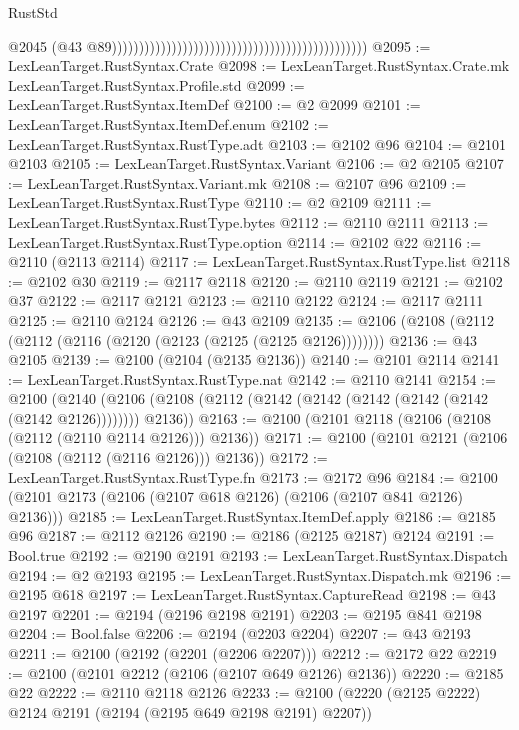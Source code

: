 \begin{lexlean}{RustStd}
\begin{coremodule}
{\begin{coremodule}
{{{{{{{{{{{{{{{{{{{{{{{{{{{{{{{{{{{{{{{{{{{{{{{{{{                                                                                                @2045
                                                                                                (@43
                                                                                                  @89)))))))))))))))))))))))))))))))))))))))))))))))
@2095 := LexLeanTarget.RustSyntax.Crate
@2098 := LexLeanTarget.RustSyntax.Crate.mk LexLeanTarget.RustSyntax.Profile.std
@2099 := LexLeanTarget.RustSyntax.ItemDef
@2100 := @2 @2099
@2101 := LexLeanTarget.RustSyntax.ItemDef.enum
@2102 := LexLeanTarget.RustSyntax.RustType.adt
@2103 := @2102 @96
@2104 := @2101 @2103
@2105 := LexLeanTarget.RustSyntax.Variant
@2106 := @2 @2105
@2107 := LexLeanTarget.RustSyntax.Variant.mk
@2108 := @2107 @96
@2109 := LexLeanTarget.RustSyntax.RustType
@2110 := @2 @2109
@2111 := LexLeanTarget.RustSyntax.RustType.bytes
@2112 := @2110 @2111
@2113 := LexLeanTarget.RustSyntax.RustType.option
@2114 := @2102 @22
@2116 := @2110 (@2113 @2114)
@2117 := LexLeanTarget.RustSyntax.RustType.list
@2118 := @2102 @30
@2119 := @2117 @2118
@2120 := @2110 @2119
@2121 := @2102 @37
@2122 := @2117 @2121
@2123 := @2110 @2122
@2124 := @2117 @2111
@2125 := @2110 @2124
@2126 := @43 @2109
@2135 := @2106 (@2108 (@2112 (@2112 (@2116 (@2120 (@2123 (@2125 (@2125 @2126))))))))
@2136 := @43 @2105
@2139 := @2100 (@2104 (@2135 @2136))
@2140 := @2101 @2114
@2141 := LexLeanTarget.RustSyntax.RustType.nat
@2142 := @2110 @2141
@2154 := @2100
    (@2140 (@2106 (@2108 (@2112 (@2142 (@2142 (@2142 (@2142 (@2142 (@2142 @2126)))))))) @2136))
@2163 := @2100 (@2101 @2118 (@2106 (@2108 (@2112 (@2110 @2114 @2126))) @2136))
@2171 := @2100 (@2101 @2121 (@2106 (@2108 (@2112 (@2116 @2126))) @2136))
@2172 := LexLeanTarget.RustSyntax.RustType.fn
@2173 := @2172 @96
@2184 := @2100 (@2101 @2173 (@2106 (@2107 @618 @2126) (@2106 (@2107 @841 @2126) @2136)))
@2185 := LexLeanTarget.RustSyntax.ItemDef.apply
@2186 := @2185 @96
@2187 := @2112 @2126
@2190 := @2186 (@2125 @2187) @2124
@2191 := Bool.true
@2192 := @2190 @2191
@2193 := LexLeanTarget.RustSyntax.Dispatch
@2194 := @2 @2193
@2195 := LexLeanTarget.RustSyntax.Dispatch.mk
@2196 := @2195 @618
@2197 := LexLeanTarget.RustSyntax.CaptureRead
@2198 := @43 @2197
@2201 := @2194 (@2196 @2198 @2191)
@2203 := @2195 @841 @2198
@2204 := Bool.false
@2206 := @2194 (@2203 @2204)
@2207 := @43 @2193
@2211 := @2100 (@2192 (@2201 (@2206 @2207)))
@2212 := @2172 @22
@2219 := @2100 (@2101 @2212 (@2106 (@2107 @649 @2126) @2136))
@2220 := @2185 @22
@2222 := @2110 @2118 @2126
@2233 := @2100 (@2220 (@2125 @2222) @2124 @2191 (@2194 (@2195 @649 @2198 @2191) @2207))
}}}}}}}}}}}}}}}}}}}}}}}}}}}}}}}}}}}}}}}}}}}}}}}}}}
\end{coremodule}}
\end{coremodule}
\end{lexlean}
